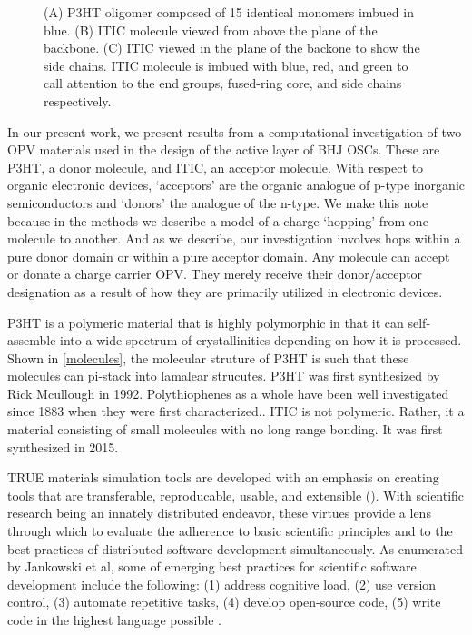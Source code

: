 \begin{figure}
\begin{subfigure}{.3\textwidth}
\end{subfigure}
    \caption[short]{(A) P3HT oligomer composed of 15 identical monomers imbued in blue.
    (B) ITIC molecule viewed from above the plane of the backbone. 
    (C) ITIC viewed in the plane of the backone to show the side chains. ITIC
    molecule is imbued with blue, red, and green to call attention to the end groups, fused-ring core, and
    side chains respectively.}
\label{molecules}
\end{figure}

In our present work, we present results from a computational investigation of two OPV materials
used in the design of the active layer of BHJ OSCs. These are P3HT, a
donor molecule, and ITIC, an acceptor molecule. With respect to organic electronic devices, `acceptors' are the
organic analogue of p-type inorganic semiconductors and `donors' the analogue
of the n-type. We make this note because in the methods we describe a model of
a charge `hopping' from one molecule to another. And as we describe, our
investigation involves hops within a pure donor domain or within a pure
acceptor domain. 
Any molecule can accept or donate a charge carrier OPV.
They merely receive their donor/acceptor designation as a result of how they
are primarily utilized in electronic devices. 

P3HT is a polymeric material that is highly polymorphic in that it can self-assemble into a wide spectrum of
crystallinities depending on how it is processed. Shown in \autoref{molecules}, the molecular struture of P3HT
is such that these molecules can pi-stack into lamalear strucutes. 
P3HT was first synthesized by Rick Mcullough in 1992. Polythiophenes as a whole have been well investigated 
since 1883 when they were first characterized.\cite{Poelking2014}.
ITIC is not polymeric. Rather, it a material consisting of small molecules with no long range bonding.
It was first synthesized in 2015. \cite{Bai201U}




TRUE materials simulation tools are developed with an emphasis on creating tools that are
transferable, reproducable, usable, and extensible (\cite{Cummings2017}).
With scientific research being an innately distributed endeavor, these virtues provide a lens through which to
evaluate the adherence to basic scientific principles and to the best practices of distributed software development
simultaneously. As enumerated by Jankowski et al, some of emerging best practices for scientific software
development include the following: (1) address cognitive load, (2) use version control, (3) automate
repetitive tasks, (4) develop open-source code, (5) write code in the highest language possible
\cite{Jankowski2020}.


